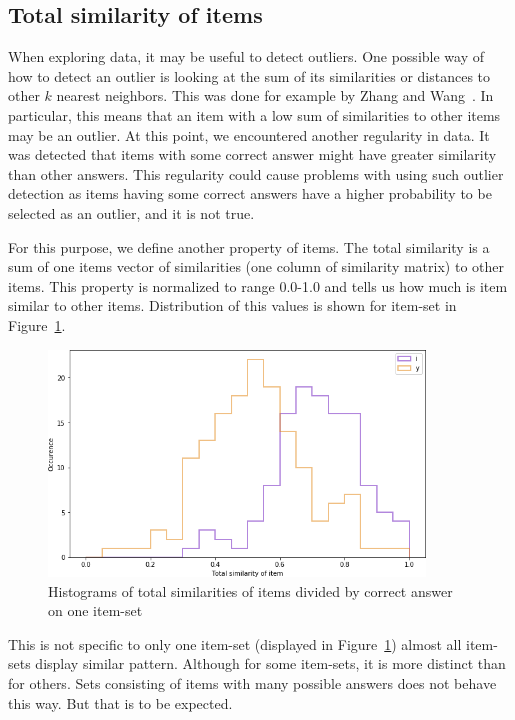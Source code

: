 \documentclass[
  printed, %
  table,   %
  nolof,     %
  nolot,     %
  color,
  final,
  nocover
]{fithesis3}
\begin{document}

\subsection{Total similarity of items}\label{total-similarity-of-items}

When exploring data, it may be useful to detect outliers. One possible way of how to detect an outlier is looking at the sum of its similarities or distances to other $k$ nearest neighbors. This was done for example by Zhang and Wang~\cite{zhang2006detecting}. In particular, this means that an item with a low sum of similarities to other items may be an outlier. At this point, we encountered another regularity in data. It was detected that items with some correct answer might have greater similarity than other answers. This regularity could cause problems with using such outlier detection as items having some correct answers have a higher probability to be selected as an outlier, and it is not true.

For this purpose, we define another property of items. The total similarity is a sum of one items vector of similarities (one column of similarity matrix) to other items. This property is normalized to range 0.0-1.0 and tells us how much is item similar to other items. Distribution of this values is shown for item-set \cviceniB{} in Figure~\ref{fig:histogram_i_y}.

\begin{figure}
  \includegraphics[width=10cm]{img/histogram_i_y}
  \caption{Histograms of total similarities of items divided by correct answer on one item-set}
  \label{fig:histogram_i_y}
\end{figure}



This is not specific to only one item-set (displayed in Figure~\ref{fig:histogram_i_y}) almost all item-sets display similar pattern. Although for some item-sets, it is more distinct than for others. Sets consisting of items with many possible answers does not behave this way. But that is to be expected.
\end{document}

